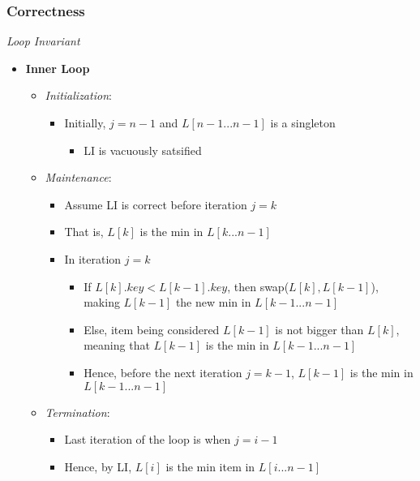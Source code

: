 \documentclass[10pt, 
a4paper, 
oneside, 
headinclude, footinclude, 
BCOR5mm]
{scrartcl}
\begin{document}
\subsubsection{Correctness}
\begin{definition}
    \textit{Loop Invariant}
    \begin{itemize}
        \item \textbf{Inner Loop}
        \begin{itemize}
            \item \textit{Initialization}:
            \begin{itemize}
                \item Initially, $j=n-1$ and $L[n-1...n-1]$ is a singleton
                \begin{itemize}
                    \item LI is vacuously satsified
                \end{itemize}
            \end{itemize}
            \item \textit{Maintenance}:
            \begin{itemize}
                \item Assume LI is correct before iteration $j=k$
                \item That is, $L[k]$ is the min in $L[k...n-1]$
                \item In iteration $j=k$
                \begin{itemize}
                    \item If $L[k].key<L[k-1].key$, then swap($L[k],L[k-1]$), making $L[k-1]$ the new min in $L[k-1...n-1]$
                    \item Else, item being considered $L[k-1]$ is not bigger than $L[k]$, meaning that $L[k-1]$ is the min in $L[k-1...n-1]$
                    \item Hence, before the next iteration $j=k-1$, $L[k-1]$ is the min in $L[k-1...n-1]$
                \end{itemize}
            \end{itemize}
            \item \textit{Termination}:
            \begin{itemize}
                \item Last iteration of the loop is when $j=i-1$
                \item Hence, by LI, $L[i]$ is the min item in $L[i...n-1]$
            \end{itemize}

\end{itemize}
\end{itemize}
\end{definition}
\end{document}
